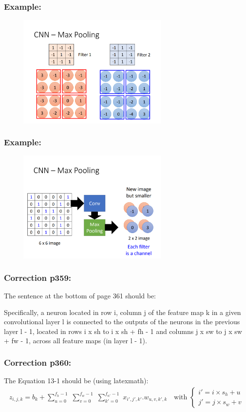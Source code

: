 \documentclass{beamer}
\begin{document}
    \begin{frame}
    \frametitle{Example: }
        \begin{figure}[H]
            \begin{center}
                \includegraphics[width=7.5cm]{ppt8}
            \end{center}
        \end{figure}
    \end{frame}
    \begin{frame}
    \frametitle{Example: }
        \begin{figure}[H]
            \begin{center}
                \includegraphics[width=7.5cm]{ppt9}
            \end{center}
        \end{figure}
    \end{frame}
    \begin{frame}
    \frametitle{Correction p359: }
    The sentence at the bottom of page 361 should be:

    Specifically, a neuron located in row i, column j of the feature map k in a given convolutional layer l is connected to the outputs of the neurons in the previous layer l - 1, located in rows i x sh to i x sh + fh - 1 and columns j x sw to j x sw + fw - 1, across all feature maps (in layer l - 1).
    \end{frame}
    \begin{frame}
    \frametitle{Correction p360: }
    The Equation 13-1 should be (using latexmath):
    \begin{align}
    z_{i,j,k} = b_k + \sum\limits_{u = 0}^{f_h - 1} \, \, \sum\limits_{v = 0}^{f_w - 1} \, \, \sum\limits_{k' = 0}^{f_{n'} - 1} \, \, x_{i', j', k'} . w_{u, v, k', k}
    \quad \text{with }
    \begin{cases}
        i' = i \times s_h + u \\
        j' = j \times s_w + v
    \end{cases}
    \end{align}
    \end{frame}
\end{document}
